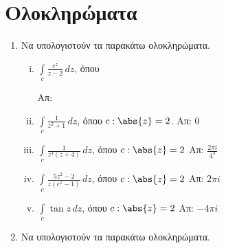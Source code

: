 \documentclass[a4paper,table]{report}
\begin{document}
\section*{Ολοκληρώματα}

\begin{enumerate}
\item Να υπολογιστούν τα παρακάτω ολοκληρώματα.

  \begin{enumerate}[i)]
    \item $ \int \limits_c\frac{e^{z}}{z-2} \,{dz} $, \quad όπου 
      \hfill Απ: 
    \item $ \int\limits_c \frac{1}{z^{2}+1} \,{dz} $, όπου $ c:\abs{z} = 2 $.
      \hfill Απ: 0 
    \item $ \int \limits_{c}\frac{1}{z^{3}(z+4)} \,{dz} $, \quad όπου $c:\abs{z}=2 $ 
      \hfill Απ: $ \frac{2 \pi i}{4^{3}} $  
    \item $\int\limits_c\frac{5z^2-2}{z(e^z-1)}\,dz$, \quad όπου $c:\abs{z}=2$ 
      \hfill Απ: $2\pi i$
    \item $\int\limits_c\tan z\,dz$, \quad όπου $c:\abs{z}=2$ \hfill Απ: $-4\pi i$
  \end{enumerate}

\pagebreak

\item Να υπολογιστούν τα παρακάτω ολοκληρώματα.


\end{enumerate}
\end{document}
